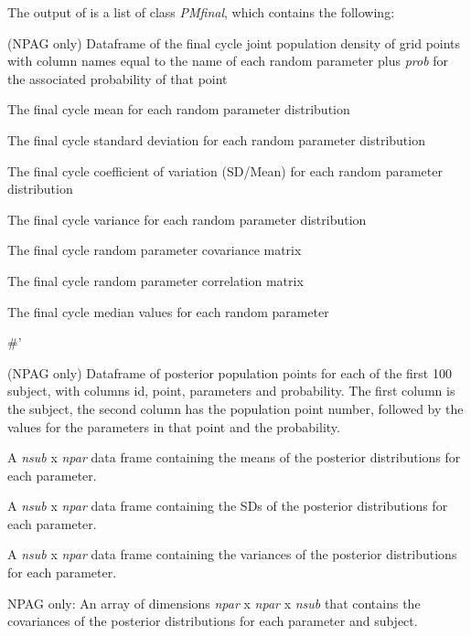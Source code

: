 \documentclass[a4paper]{book}
\begin{document}
\begin{Value}
The output of  is a list of class \emph{PMfinal}, which contains the following:
\begin{ldescription}
\item[\code{popPoints }] (NPAG only) Dataframe of the final cycle joint population density of grid points
with column names equal to the name of each random parameter plus \emph{prob} for the
associated probability of that point
\item[\code{popMean }] The final cycle mean for each random parameter distribution
\item[\code{popSD }] The final cycle standard deviation for each random parameter distribution
\item[\code{popCV }] The final cycle coefficient of variation (SD/Mean) for each random parameter distribution
\item[\code{popVar }] The final cycle variance for each random parameter distribution
\item[\code{popCov }] The final cycle random parameter covariance matrix
\item[\code{popCor }] The final cycle random parameter correlation matrix
\item[\code{popMedian }] The final cycle median values for each random parameter
\end{ldescription}
\#' \begin{ldescription}
\item[\code{postPoints}] (NPAG only) Dataframe of posterior population points for each of the first 100 subject,
with columns id, point, parameters and probability.  The first column is the subject, the second column has the population
point number, followed by the values for the parameters in that point and the probability.
\item[\code{postMean }] A \emph{nsub} x \emph{npar} data frame containing 
the means of the posterior distributions for each parameter.
\item[\code{postSD }] A \emph{nsub} x \emph{npar} data frame containing 
the SDs of the posterior distributions for each parameter.
\item[\code{postVar }] A \emph{nsub} x \emph{npar} data frame containing 
the variances of the posterior distributions for each parameter.
\item[\code{postCov }] NPAG only: An array of dimensions \emph{npar} x \emph{npar} x \emph{nsub} that
contains the covariances of the posterior distributions for each parameter and subject.

\end{ldescription}
\end{Value}
\end{document}
